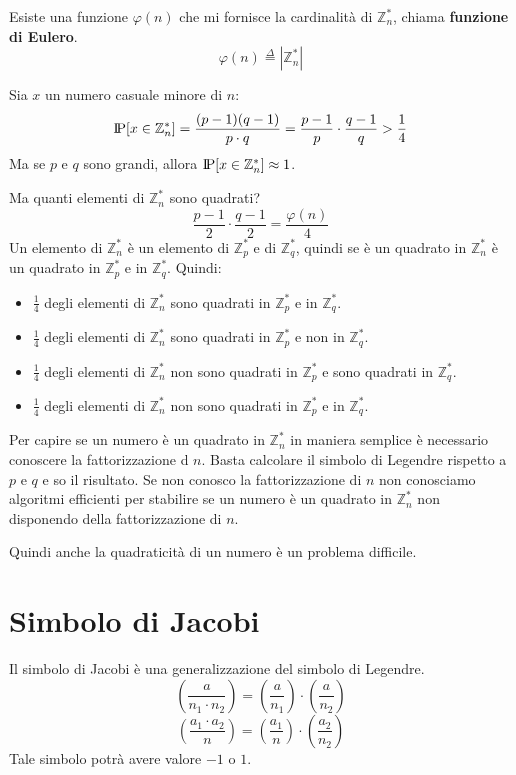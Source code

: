 Esiste una funzione $\varphi(n)$ che mi fornisce la cardinalità di 
$\mathbb{Z}_n^*$, chiama \textbf{funzione di Eulero}.
\[
  \varphi(n) \stackrel{\Delta}{=} |\mathbb{Z}_n^*|
\]

Sia $x$ un numero casuale minore di $n$:
\[
  \text{I\kern-0.15em P}[x \in \mathbb{Z}_n^*] = \frac{(p-1)(q-1)}{p\cdot q} =
  \frac{p-1}{p} \cdot \frac{q-1}{q} > \frac{1}{4}
\]
Ma se $p$ e $q$ sono grandi, allora $\text{I\kern-0.15em P}[x \in \mathbb{Z}_n^*] \approx 1$.

Ma quanti elementi di $\mathbb{Z}_n^*$ sono quadrati?
\[
  \frac{p - 1}{2} \cdot \frac{q - 1}{2} = \frac{\varphi(n)}{4}
\]
Un elemento di $\mathbb{Z}_n^*$ è un elemento di $\mathbb{Z}_p^*$ e 
di $\mathbb{Z}_q^*$, quindi se è un quadrato in $\mathbb{Z}_n^*$ è un
quadrato in $\mathbb{Z}_p^*$ e in $\mathbb{Z}_q^*$.
Quindi:
\begin{itemize}
  \item $\frac{1}{4}$ degli elementi di $\mathbb{Z}_n^*$ sono quadrati in 
  $\mathbb{Z}_p^*$ e in $\mathbb{Z}_q^*$.
  \item $\frac{1}{4}$ degli elementi di $\mathbb{Z}_n^*$ sono quadrati in 
  $\mathbb{Z}_p^*$ e non in $\mathbb{Z}_q^*$.
  \item $\frac{1}{4}$ degli elementi di $\mathbb{Z}_n^*$ non sono quadrati in
  $\mathbb{Z}_p^*$ e sono quadrati in $\mathbb{Z}_q^*$.
  \item $\frac{1}{4}$ degli elementi di $\mathbb{Z}_n^*$ non sono quadrati in
  $\mathbb{Z}_p^*$ e in $\mathbb{Z}_q^*$.
\end{itemize}
Per capire se un numero è un quadrato in $\mathbb{Z}_n^*$  in 
maniera semplice è necessario conoscere la fattorizzazione d $n$.
Basta calcolare il simbolo di Legendre rispetto a $p$ e $q$ e so il
risultato. Se non conosco la fattorizzazione di $n$ non conosciamo 
algoritmi efficienti per stabilire se un numero è un quadrato in
$\mathbb{Z}_n^*$ non disponendo della fattorizzazione di $n$.

Quindi anche la quadraticità di un numero è un problema difficile.

\section{Simbolo di Jacobi}
Il simbolo di Jacobi è una generalizzazione del simbolo di Legendre.
\[
    \left(\frac{a}{n_1 \cdot n_2}\right) = 
    \left(\frac{a}{n_1}\right) \cdot \left(\frac{a}{n_2}\right)
  \]
  \[
    \left(\frac{a_1 \cdot a_2}{n}\right) = 
    \left(\frac{a_1}{n}\right) \cdot \left(\frac{a_2}{n_2}\right)
  \]
  Tale simbolo potrà avere valore $-1$ o $1$.

